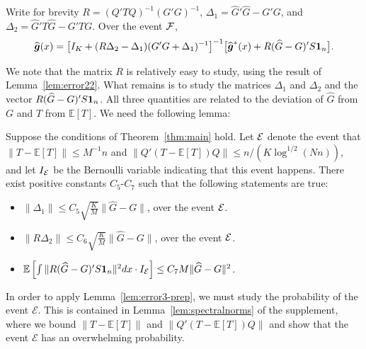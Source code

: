 \documentclass[preprint,11pt]{article}
\newcommand{\mbb}{\mathbb}
\newcommand{\bg}{{\boldsymbol g}}
\numberwithin{equation}{section}
\newcommand{\beq}{\begin{equation}}
\newcommand{\eeq}{\end{equation}}
\begin{document}
\begin{lemma} \label{lem:error3-decompose}
Write for brevity $R = (Q'TQ)^{-1}(G'G)^{-1}$, $\Delta_1 = \widehat{G}'\widehat{G}- G'G$, and $\Delta_2=\widehat{G}'T\widehat{G}-G'TG$. Over the event ${\cal F}$, 
\beq \label{error3-decompose}
\widehat{\boldsymbol g}(x) = \bigl[ I_K + (R\Delta_2-\Delta_1)(G'G+\Delta_1)^{-1}\bigr]^{-1}\bigl[ \widehat{\bg}^*(x) + R(\widehat{G}-G)'S{\bf 1}_n\bigr]. 
\eeq 
\end{lemma}

We note that the matrix $R$ is relatively easy to study, using the result of Lemma~\ref{lem:error22}. What remains is to study the matrices $\Delta_1$ and $\Delta_2$ and the vector $R(\widehat{G}-G)'S{\bf 1}_n$. All three quantities are related to the deviation of $\widehat{G}$ from $G$ and $T$ from $\mbb{E}[T]$. We need the following lemma:
\begin{lemma} \label{lem:error3-prep}
Suppose the conditions of Theorem~\ref{thm:main} hold. Let ${\cal E}$ denote the event that $\|T-\mbb{E}[T]\|\leq M^{-1}n$ and $\|Q'(T-\mbb{E}[T])Q\|\leq n/(K\log^{1/2}(Nn))$, and let $I_{\cal E}$ be the Bernoulli variable indicating that this event happens. There exist positive constants  $C_5$-$C_7$ such that the following statements are true:
\begin{itemize}
\item $\|\Delta_1\|\le C_5\sqrt{\frac{K}{M}}\|\widehat{G}- G\|$, over the event ${\cal E}$. 
\item $\|R\Delta_2\|\leq C_6\sqrt{\frac{K}{M}}\|\widehat{G}- G\|$, over the event ${\cal E}$. 
\item $\mbb{E}\left[\int \|R(\widehat{G}-G)'S{\bf 1}_n\|^2dx\cdot I_{\cal E}\right]\le  C_7M\|\widehat{G}- G\|^2$.
\end{itemize}
\end{lemma} 

In order to apply Lemma~\ref{lem:error3-prep}, we must study the probability of the event $\mathcal{E}$. 
This is contained in  Lemma~\ref{lem:spectralnorms} of the supplement, where we bound $\|T-\mathbb{E}[T]\|$ and $\|Q'(T-\mathbb{E}[T])Q\|$ and show that the event $\mathcal{E}$ has an overwhelming probability.  
\end{document}
